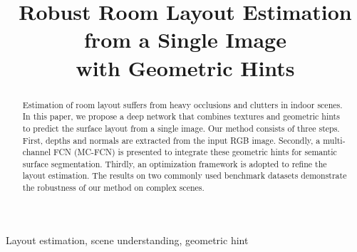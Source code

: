 \documentclass{article}
\title{Robust Room Layout Estimation from a Single Image \\ with Geometric Hints}
\begin{document}
%
\maketitle
%
\begin{abstract}
Estimation of room layout suffers from heavy occlusions and clutters in indoor scenes.
%
In this paper, we propose a deep network that combines textures and geometric hints to predict the surface layout from a single image.
%
Our method consists of three steps. First, depths and normals are extracted from the input RGB image. Secondly, a multi-channel FCN (MC-FCN) is presented to integrate these geometric hints for semantic surface segmentation. Thirdly, an optimization framework is adopted to refine the layout estimation. 
The results on two commonly used benchmark datasets demonstrate the robustness of our method on complex scenes. 
	
\end{abstract}
%
\begin{keywords}
Layout estimation, scene understanding, geometric hint
\end{keywords}
%






 

 


\end{document}
